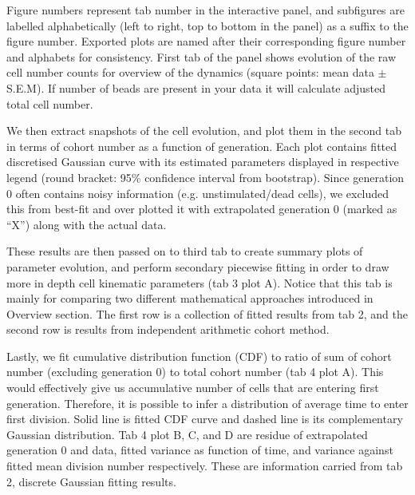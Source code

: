 \documentclass{article}
\begin{document}
Figure numbers represent tab number in the interactive panel, and subfigures are labelled alphabetically (left to right, top to bottom in the panel) as a suffix to the figure number. Exported plots are named after their corresponding figure number and alphabets for consistency.
First tab of the panel shows evolution of the raw cell number counts for overview of the dynamics (square points: mean data $\pm$ S.E.M). If number of beads are present in your data it will calculate adjusted total cell number.

We then extract snapshots of the cell evolution, and plot them in the second tab in terms of cohort number as a function of generation. Each plot contains fitted discretised Gaussian curve with its estimated parameters displayed in respective legend (round bracket: 95\% confidence interval from bootstrap). Since generation 0 often contains noisy information (e.g. unstimulated/dead cells), we excluded this from best-fit and over plotted it with extrapolated generation 0 (marked as “X”) along with the actual data.

These results are then passed on to third tab to create summary plots of parameter evolution, and perform secondary piecewise fitting in order to draw more in depth cell kinematic parameters (tab 3 plot A). Notice that this tab is mainly for comparing two different mathematical approaches introduced in Overview section. The first row is a collection of fitted results from tab 2, and the second row is results from independent arithmetic cohort method.

Lastly, we fit cumulative distribution function (CDF) to ratio of sum of cohort number (excluding generation 0) to total cohort number (tab 4 plot A). This would effectively give us accumulative number of cells that are entering first generation. Therefore, it is possible to infer a distribution of average time to enter first division. Solid line is fitted CDF curve and dashed line is its complementary Gaussian distribution. Tab 4 plot B, C, and D are residue of extrapolated generation 0 and data, fitted variance as function of time, and variance against fitted mean division number respectively. These are information carried from tab 2, discrete Gaussian fitting results.

\end{document}
